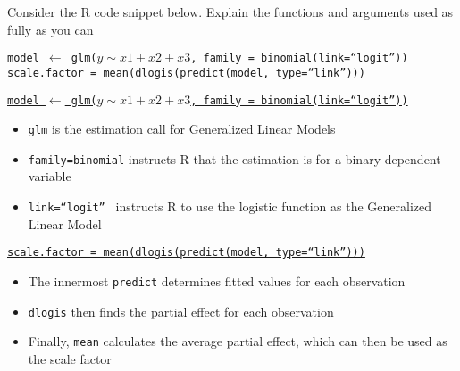 
\question Consider the R code snippet below. Explain the functions and arguments used as fully as you can

  \texttt{model $\leftarrow$ glm($y\sim x1+x2+x3$, family = binomial(link=``logit''))}\\
  \texttt{scale.factor = mean(dlogis(predict(model, type=``link'')))}

\begin{solution}

  \underline{\texttt{model $\leftarrow$ glm($y\sim x1+x2+x3$, family = binomial(link=``logit''))}}
  \begin{itemize}
  \item{\texttt{glm} is the estimation call for Generalized Linear Models}
  \item{\texttt{family=binomial} instructs R that the estimation is for a binary dependent variable}
  \item{\texttt{link=``logit'' } instructs R to use the logistic function as the Generalized Linear Model}
  \end{itemize}

  \underline{\texttt{scale.factor = mean(dlogis(predict(model, type=``link'')))}}
  \begin{itemize}
  \item{The innermost \texttt{predict} determines fitted values for each observation}
  \item{\texttt{dlogis} then finds the partial effect for each observation}
  \item{Finally, \texttt{mean} calculates the average partial effect, which can then be used as the scale factor}
  \end{itemize}
\end{solution}

